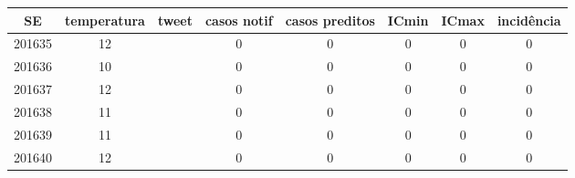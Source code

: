 \begin{tabular}{c|ccccccc}
  \hline
SE & temperatura & tweet & casos notif & casos preditos & ICmin & ICmax & incidência \\ 
  \hline
201635 & 12 &  & 0 & 0 & 0 & 0 & 0 \\ 
  201636 & 10 &  & 0 & 0 & 0 & 0 & 0 \\ 
  201637 & 12 &  & 0 & 0 & 0 & 0 & 0 \\ 
  201638 & 11 &  & 0 & 0 & 0 & 0 & 0 \\ 
  201639 & 11 &  & 0 & 0 & 0 & 0 & 0 \\ 
  201640 & 12 &  & 0 & 0 & 0 & 0 & 0 \\ 
   \hline
\end{tabular}
